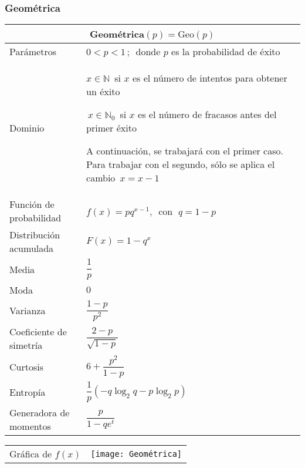 \documentclass[12pt,a4paper]{article}
\newcommand{\salto}[1][2]{\par\vspace{#1mm}}
\begin{document}
\subsubsection*{Geométrica}
\begin{center}
	\begin{tabular}{p{}|p{}}
	\multicolumn{2}{c}{Geométrica$(p) = \text{Geo}(p)$} \\
	\hline
	Parámetros & $0 < p < 1\,;\,$ donde $p$ es la probabilidad de éxito  \\
	Dominio & $x\in\mathbb{N}\,$ si $x$ es el número de intentos para obtener un éxito\salto $\,x\in\mathbb{N}_0\,$ si $x$ es el número de fracasos antes del primer éxito\salto A continuación, se trabajará con el primer caso. Para trabajar con el segundo, sólo se aplica el cambio $\,x = x - 1$
	 \\
	Función de probabilidad & $f(x) = pq^{x - 1},\,$ con $\; q = 1 - p$ \\
	Distribución acumulada & $F(x) = 1 - q^x$ \\
	Media & $\dfrac{1}{p}$ \\
	Moda & $0$ \\
	Varianza & $\dfrac{1 - p}{p^2}$ \\
	Coeficiente de simetría & $\dfrac{2 - p}{\sqrt{1 - p}}$ \\
	Curtosis & $6 + \dfrac{p^2}{1 - p}$ \\
	Entropía & $\dfrac{1}{p}(-q\log_2q - p\log_2p)$ \\
	Generadora de momentos & $\dfrac{p}{1 - qe^t}$ 
	\end{tabular}
	\begin{tabular}{p{}|p{}}
	\vspace{0.25cm}Gráfica de $f(x)$ & \vspace{0.1mm}\texttt{[image: Geométrica]}
	\end{tabular}
\end{center}
\end{document}
